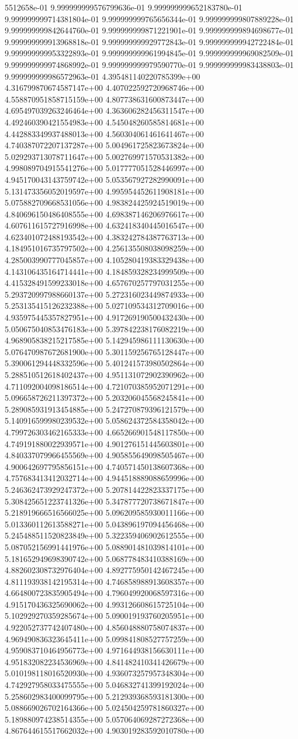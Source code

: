 5512658e-01	9.999999999576799636e-01	9.999999999652183780e-01	9.999999999714381804e-01	9.999999999765656344e-01	9.999999999807889228e-01	9.999999999842644760e-01	9.999999999871221901e-01	9.999999999894698677e-01	9.999999999913968818e-01	9.999999999929772843e-01	9.999999999942722484e-01	9.999999999953322893e-01	9.999999999961994845e-01	9.999999999969082509e-01	9.999999999974868992e-01	9.999999999979590770e-01	9.999999999983438803e-01	9.999999999986572963e-01
4.395481140220785399e+00	4.316799870674587147e+00	4.407022592720968746e+00	4.558870951858715159e+00	4.807738631600873447e+00	4.695497039263246464e+00	4.363606282456311547e+00	4.492460390421554983e+00	4.545048260585814681e+00	4.442883349937488013e+00	4.560304061461641467e+00	4.740387072207137287e+00	5.004961725823673824e+00	5.029293713078711647e+00	5.002769971570531382e+00	4.998089704915541276e+00	5.017777051528446997e+00	4.945170043143759742e+00	5.053567927282990091e+00	5.131473356052019597e+00	4.995954452611908181e+00	5.075882709668531056e+00	4.983824425924519019e+00	4.840696150486408555e+00	4.698387146206976617e+00	4.607611615727916998e+00	4.632418340445016547e+00	4.623401072488193542e+00	4.383242784387763713e+00	4.184951016735797502e+00	4.256135508038098259e+00	4.285003990777045857e+00	4.105280419383329438e+00	4.143106435164714441e+00	4.184859328234999509e+00	4.415328491599233018e+00	4.657670257797031255e+00	5.293720997988660137e+00	5.272316023449874933e+00	5.253135415126232388e+00	5.027109534312709016e+00	4.935975445357827951e+00	4.917269190500432430e+00	5.050675040853476183e+00	5.397842238176082219e+00	4.968905838215217585e+00	5.142945986111130630e+00	5.076470987672681900e+00	5.301159256765128447e+00	5.390061294448332596e+00	5.401241573980502864e+00	5.288510512618402437e+00	4.951131072902390962e+00	4.711092004098186514e+00	4.721070385952071291e+00	5.096658726211397372e+00	5.203206045568245841e+00	5.289085931913454885e+00	5.247270879396121579e+00	5.140916599980239532e+00	5.058624372584358042e+00	4.799726303462165333e+00	4.665266901548117850e+00	4.749191880022939571e+00	4.901276151445603801e+00	4.840337079966455569e+00	4.905855649098505467e+00	4.900642697795856151e+00	4.740571450138607368e+00	4.757683413412032714e+00	4.944518889088659996e+00	5.246362473929247372e+00	5.207814422823337175e+00	5.308425651223741326e+00	5.347877720738671847e+00	5.218919666516566025e+00	5.096209585930011166e+00	5.013360112613588271e+00	5.043896197094456468e+00	5.245488511520823849e+00	5.322359406902612555e+00	5.087052156991441976e+00	5.088901481039814101e+00	5.181652949698390742e+00	5.068778483410388169e+00	4.882602308732976404e+00	4.892775950142467245e+00	4.811193938142195314e+00	4.746858988913608357e+00	4.664800723835905494e+00	4.796049920068597316e+00	4.915170436325690062e+00	4.993126608615725104e+00	5.102929270359285674e+00	5.090019193760205951e+00	4.922052737742407480e+00	4.856048880758074837e+00	4.969490836323645411e+00	5.099841808527757259e+00	4.959083710464956773e+00	4.971644938156630111e+00	4.951832082234536969e+00	4.841482410341426679e+00	5.010198118016520930e+00	4.936073257957348304e+00	4.742927958033475555e+00	5.046832741399192024e+00	5.258602983400099795e+00	5.212939368593181300e+00	5.088669026702164366e+00	5.024504259781860327e+00	5.189880974238514355e+00	5.057064069287272368e+00	4.867644615517662032e+00	4.903019283592010780e+00